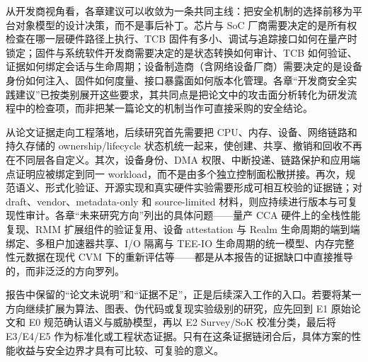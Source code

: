 \documentclass[11pt]{ctexart}
\begin{document}
从开发商视角看，各章建议可以收敛为一条共同主线：把安全机制的选择前移为平台对象模型的设计决策，而不是事后补丁。芯片与 SoC 厂商需要决定的是所有权检查在哪一层硬件路径上执行、TCB 固件有多小、调试与追踪接口如何在量产时锁定；固件与系统软件开发商需要决定的是状态转换如何审计、TCB 如何验证、证据如何绑定会话与生命周期；设备制造商（含网络设备厂商）需要决定的是设备身份如何注入、固件如何度量、接口暴露面如何版本化管理。各章“开发商安全实践建议”已按类别展开这些要求，其共同点是把论文中的攻击面分析转化为研发流程中的检查项，而非把某一篇论文的机制当作可直接采购的安全结论。

从论文证据走向工程落地，后续研究首先需要把 CPU、内存、设备、网络链路和持久存储的 ownership/lifecycle 状态机统一起来，使创建、共享、撤销和回收不再在不同层各自定义。其次，设备身份、DMA 权限、中断投递、链路保护和应用端点证明应被绑定到同一 workload，而不是由多个独立控制面松散拼接。再次，规范语义、形式化验证、开源实现和真实硬件实验需要形成可相互校验的证据链；对 draft、vendor、metadata-only 和 source-limited 材料，则应持续进行版本与可复现性审计。各章“未来研究方向”列出的具体问题——量产 CCA 硬件上的全栈性能复现、RMM 扩展组件的验证复用、设备 attestation 与 Realm 生命周期的端到端绑定、多租户加速器共享、I/O 隔离与 TEE-IO 生命周期的统一模型、内存完整性元数据在现代 CVM 下的重新评估等——都是从本报告的证据缺口中直接推导的，而非泛泛的方向罗列。

报告中保留的“论文未说明”和“证据不足”，正是后续深入工作的入口。若要将某一方向继续扩展为算法、图表、伪代码或复现实验级别的研究，应先回到 E1 原始论文和 E0 规范确认语义与威胁模型，再以 E2 Survey/SoK 校准分类，最后将 E3/E4/E5 作为标准化或工程状态证据。只有在这条证据链闭合后，具体方案的性能收益与安全边界才具有可比较、可复验的意义。


\end{document}
